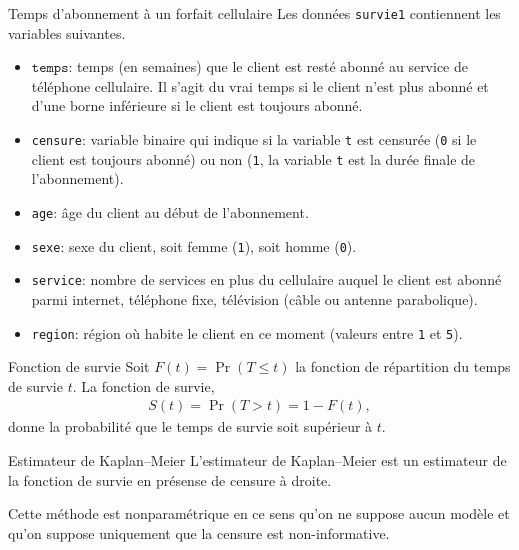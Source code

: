\documentclass[
  ignorenonframetext,
]{beamer}
\providecommand{\tightlist}{%
  \setlength{\itemsep}{0pt}\setlength{\parskip}{0pt}}
\begin{document}
\begin{frame}[fragile]{Temps d'abonnement à un forfait cellulaire}
\protect{}\label{temps-dabonnement-uxe0-un-forfait-cellulaire}
Les données \texttt{survie1} contiennent les variables suivantes.

\begin{itemize}
\tightlist
\item
  \(\texttt{temps}\): temps (en semaines) que le client est resté abonné
  au service de téléphone cellulaire. Il s'agit du vrai temps si le
  client n'est plus abonné et d'une borne inférieure si le client est
  toujours abonné.
\item
  \texttt{censure}: variable binaire qui indique si la variable
  \texttt{t} est censurée (\texttt{0} si le client est toujours abonné)
  ou non (\texttt{1}, la variable \texttt{t} est la durée finale de
  l'abonnement).
\item
  \texttt{age}: âge du client au début de l'abonnement.
\item
  \texttt{sexe}: sexe du client, soit femme (\texttt{1}), soit homme
  (\texttt{0}).
\item
  \texttt{service}: nombre de services en plus du cellulaire auquel le
  client est abonné parmi internet, téléphone fixe, télévision (câble ou
  antenne parabolique).
\item
  \texttt{region}: région où habite le client en ce moment (valeurs
  entre \texttt{1} et \texttt{5}).
\end{itemize}
\end{frame}

\begin{frame}{Fonction de survie}
\protect{}\label{fonction-de-survie}
Soit \(F(t)=\Pr(T \leq t)\) la fonction de répartition du temps de
survie \(t\). La fonction de survie, \begin{align*}
S(t)= \Pr(T > t) = 1-F(t),
\end{align*} donne la probabilité que le temps de survie soit supérieur
à \(t\).
\end{frame}

\begin{frame}{Estimateur de Kaplan--Meier}
\protect{}\label{estimateur-de-kaplanmeier}
L'estimateur de Kaplan--Meier est un estimateur de la fonction de survie
en présense de censure à droite.

Cette méthode est nonparamétrique en ce sens qu'on ne suppose aucun
modèle et qu'on suppose uniquement que la censure est non-informative.
\end{frame}
\end{document}
